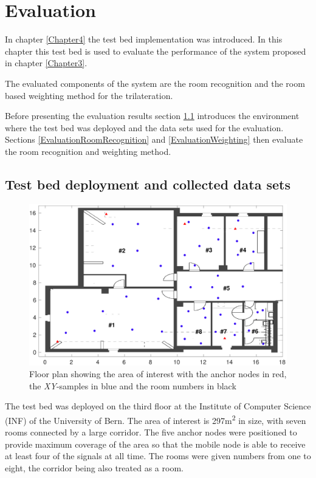 \chapter{Evaluation}
\newcommand{\rd}[1]{\textcolor{red}{#1}}
\newcommand{\gn}[1]{\textcolor{green}{#1}}

\label{Chapter5}

In chapter \ref{Chapter4} the test bed implementation was introduced. In this chapter this test bed is used to evaluate the performance of the system proposed in chapter \ref{Chapter3}.

The evaluated components of the system are the room recognition and the room based weighting method for the trilateration.

Before presenting the evaluation results section \ref{TestBedDeployment} introduces the environment where the test bed was deployed and the data sets used for the evaluation. Sections \ref{EvaluationRoomRecognition} and \ref{EvaluationWeighting} then evaluate the room recognition and weighting method.

\section{Test bed deployment and collected data sets}
\label{TestBedDeployment}

\begin{figure}[ht]
\centering
\includegraphics[width=\textwidth]{Figures/FloorPlan_ANs}
\decoRule
\caption[Floor plan]{Floor plan showing the area of interest with the anchor nodes in red, the \emph{XY}-samples in blue and the room numbers in black}
\label{fig:FloorPlanANs}
\end{figure}

The test bed was deployed on the third floor at the Institute of Computer Science (INF) of the University of Bern. The area of interest is 297m\textsuperscript{2} in size, with seven rooms connected by a large corridor. The five anchor nodes were positioned to provide maximum coverage of the area so that the mobile node is able to receive at least four of the signals at all time. The rooms were given numbers from one to eight, the corridor being also treated as a room.


